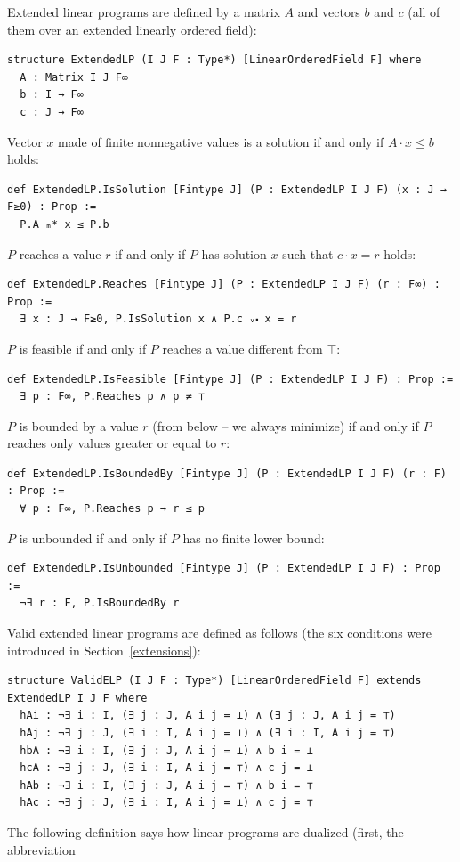\documentclass[]{article}
\renewcommand{\.}{\hskip .75pt}
\newcommand{\sekt}[1]{Section~\ref{#1}}
\let\*=\cdot
\begin{document}
Extended linear programs are defined by a matrix $A$ and vectors $b$ and $c$
(all of them over an extended linearly ordered field):
\begin{lstlisting}
structure ExtendedLP (I J F : Type*) [LinearOrderedField F] where
  A : Matrix I J F∞
  b : I → F∞
  c : J → F∞
\end{lstlisting}
Vector $x$ made of finite nonnegative values is a solution if and only if $A \* x \le b$
holds:
\begin{lstlisting}
def ExtendedLP.IsSolution [Fintype J] (P : ExtendedLP I J F) (x : J → F≥0) : Prop :=
  P.A ₘ* x ≤ P.b
\end{lstlisting}
$P$ reaches a value $r$ if and only if $P$ has solution $x$ such that $c \* x = r$ holds:
\begin{lstlisting}
def ExtendedLP.Reaches [Fintype J] (P : ExtendedLP I J F) (r : F∞) : Prop :=
  ∃ x : J → F≥0, P.IsSolution x ∧ P.c ᵥ⬝ x = r
\end{lstlisting}
$P$ is feasible if and only if $P$ reaches a value different from $\top$:
\begin{lstlisting}
def ExtendedLP.IsFeasible [Fintype J] (P : ExtendedLP I J F) : Prop :=
  ∃ p : F∞, P.Reaches p ∧ p ≠ ⊤
\end{lstlisting}
$P$ is bounded by a value $r$ (from below -- we always minimize) if and only if
$P$ reaches only values greater or equal to $r$:
\begin{lstlisting}
def ExtendedLP.IsBoundedBy [Fintype J] (P : ExtendedLP I J F) (r : F) : Prop :=
  ∀ p : F∞, P.Reaches p → r ≤ p
\end{lstlisting}
$P$ is unbounded if and only if $P$ has no finite lower bound:
\begin{lstlisting}
def ExtendedLP.IsUnbounded [Fintype J] (P : ExtendedLP I J F) : Prop :=
  ¬∃ r : F, P.IsBoundedBy r
\end{lstlisting}
Valid extended linear programs are defined as follows (the six conditions were
introduced in \sekt{extensions}):
\begin{lstlisting}
structure ValidELP (I J F : Type*) [LinearOrderedField F] extends ExtendedLP I J F where
  hAi : ¬∃ i : I, (∃ j : J, A i j = ⊥) ∧ (∃ j : J, A i j = ⊤)
  hAj : ¬∃ j : J, (∃ i : I, A i j = ⊥) ∧ (∃ i : I, A i j = ⊤)
  hbA : ¬∃ i : I, (∃ j : J, A i j = ⊥) ∧ b i = ⊥
  hcA : ¬∃ j : J, (∃ i : I, A i j = ⊤) ∧ c j = ⊥
  hAb : ¬∃ i : I, (∃ j : J, A i j = ⊤) ∧ b i = ⊤
  hAc : ¬∃ j : J, (∃ i : I, A i j = ⊥) ∧ c j = ⊤
\end{lstlisting}
The following definition says how linear programs are dualized (first, the abbreviation
\end{document}
